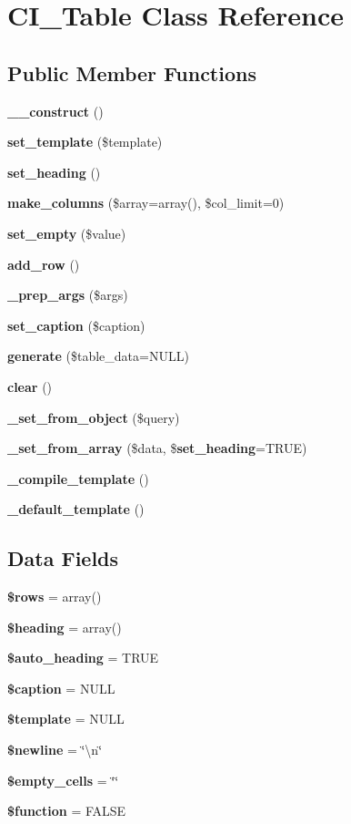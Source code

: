 \section{C\-I\-\_\-\-Table Class Reference}
\label{class_c_i___table}
\subsection*{Public Member Functions}
\begin{DoxyCompactItemize}
\item 
{\bf \-\_\-\-\_\-construct} ()
\item 
{\bf set\-\_\-template} (\$template)
\item 
{\bf set\-\_\-heading} ()
\item 
{\bf make\-\_\-columns} (\$array=array(), \$col\-\_\-limit=0)
\item 
{\bf set\-\_\-empty} (\$value)
\item 
{\bf add\-\_\-row} ()
\item 
{\bf \-\_\-prep\-\_\-args} (\$args)
\item 
{\bf set\-\_\-caption} (\$caption)
\item 
{\bf generate} (\$table\-\_\-data=N\-U\-L\-L)
\item 
{\bf clear} ()
\item 
{\bf \-\_\-set\-\_\-from\-\_\-object} (\$query)
\item 
{\bf \-\_\-set\-\_\-from\-\_\-array} (\$data, \${\bf set\-\_\-heading}=T\-R\-U\-E)
\item 
{\bf \-\_\-compile\-\_\-template} ()
\item 
{\bf \-\_\-default\-\_\-template} ()
\end{DoxyCompactItemize}
\subsection*{Data Fields}
\begin{DoxyCompactItemize}
\item 
{\bf \$rows} = array()
\item 
{\bf \$heading} = array()
\item 
{\bf \$auto\-\_\-heading} = T\-R\-U\-E
\item 
{\bf \$caption} = N\-U\-L\-L
\item 
{\bf \$template} = N\-U\-L\-L
\item 
{\bf \$newline} = \char`\"{}\textbackslash{}n\char`\"{}
\item 
{\bf \$empty\-\_\-cells} = \char`\"{}\char`\"{}
\item 
{\bf \$function} = F\-A\-L\-S\-E
\end{DoxyCompactItemize}


